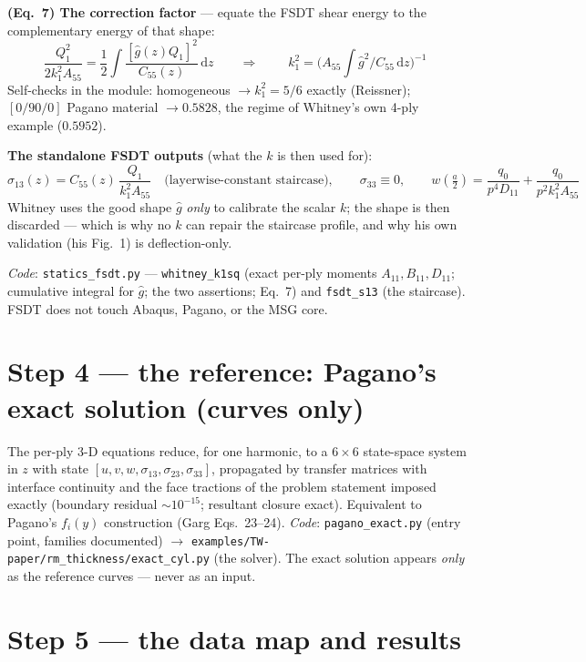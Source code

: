 \documentclass[11pt]{article}
\newcommand{\code}[1]{\texttt{#1}}
\begin{document}
\textbf{(Eq.~7) The correction factor} --- equate the FSDT shear energy to the
complementary energy of that shape:
\begin{equation}
\frac{Q_1^2}{2k_1^2A_{55}} = \frac12\int\frac{[\hat g(z)Q_1]^2}{C_{55}(z)}\,\mathrm dz
\qquad\Longrightarrow\qquad
\boxed{\;k_1^2 = \Big(A_{55}\int \hat g^2/C_{55}\,\mathrm dz\Big)^{-1}\;}
\end{equation}
Self-checks in the module: homogeneous $\rightarrow k_1^2 = 5/6$ exactly (Reissner);
$[0/90/0]$ Pagano material $\rightarrow 0.5828$, the regime of Whitney's own 4-ply
example ($0.5952$).

\textbf{The standalone FSDT outputs} (what the $k$ is then used for):
\begin{equation}
\sigma_{13}(z) = C_{55}(z)\,\frac{Q_1}{k_1^2A_{55}} \quad\text{(layerwise-constant
staircase)},\qquad \sigma_{33}\equiv 0,\qquad
w\!\left(\tfrac a2\right) = \frac{q_0}{p^4D_{11}} + \frac{q_0}{p^2k_1^2A_{55}}
\end{equation}
Whitney uses the good shape $\hat g$ \emph{only} to calibrate the scalar $k$; the shape
is then discarded --- which is why no $k$ can repair the staircase profile, and why his
own validation (his Fig.~1) is deflection-only.

\emph{Code}: \code{statics\_fsdt.py} --- \code{whitney\_k1sq} (exact per-ply moments
$A_{11},B_{11},D_{11}$; cumulative integral for $\hat g$; the two assertions; Eq.~7) and
\code{fsdt\_s13} (the staircase).  FSDT does not touch Abaqus, Pagano, or the MSG core.

\section{Step 4 --- the reference: Pagano's exact solution (curves only)}

The per-ply 3-D equations reduce, for one harmonic, to a $6\times6$ state-space system
in $z$ with state $[u,v,w,\sigma_{13},\sigma_{23},\sigma_{33}]$, propagated by transfer
matrices with interface continuity and the face tractions of the problem statement
imposed exactly (boundary residual $\sim 10^{-15}$; resultant closure exact).
Equivalent to Pagano's $f_i(y)$ construction (Garg Eqs.~23--24).
\emph{Code}: \code{pagano\_exact.py} (entry point, families documented)
$\rightarrow$ \code{examples/TW-paper/rm\_thickness/exact\_cyl.py} (the solver).
The exact solution appears \emph{only} as the reference curves --- never as an input.

\section{Step 5 --- the data map and results}
\end{document}
